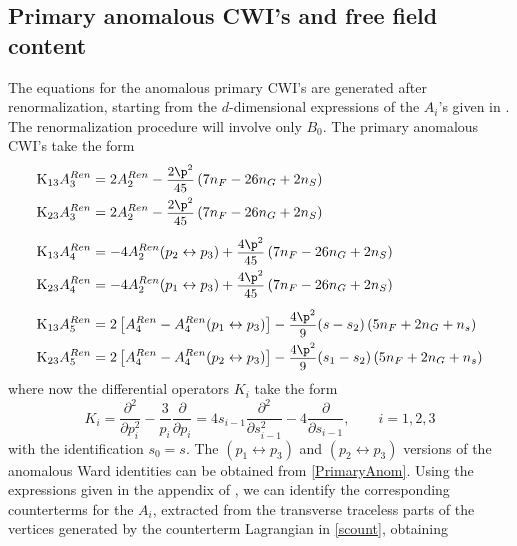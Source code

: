 \documentclass[a4paper,11pt,openright,twoside]{book}
\newcommand{\sdfrac}[2]{\mbox{\small$\displaystyle\frac{#1}{#2}$}}
\numberwithin{equation}{section}
\begin{document}
{{\subsection{Primary anomalous CWI's and free field content}
The equations for the anomalous primary CWI's are generated after renormalization, starting from the $d$-dimensional expressions of the $A_i$'s  given in \cite{Coriano:2018bsy}. The renormalization procedure will involve only $B_0$.
The primary anomalous CWI's take the form
\begin{equation}
	\begin{split}
		& \textup{K}_{13}A^{Ren}_3=2A^{Ren}_2-\sdfrac{2\p^2}{45}\left(7n_F-26n_G+2n_S\right) \\
		&\textup{K}_{23}A^{Ren}_3=2A^{Ren}_2-\sdfrac{2\p^2}{45}\left(7n_F-26n_G+2n_S\right) \\[1.1ex]
		& \textup{K}_{13}A^{Ren}_4=-4A^{Ren}_2(p_2\leftrightarrow p_3)+\sdfrac{4\p^2}{45}\left(7n_F-26n_G+2n_S\right) \\
		&\textup{K}_{23}A^{Ren}_4=-4A^{Ren}_2(p_1\leftrightarrow p_3)+\sdfrac{4\p^2}{45}\left(7n_F-26n_G+2n_S\right) \\[1.1ex]
		& \textup{K}_{13}A^{Ren}_5=2\left[A^{Ren}_4-A^{Ren}_4(p_1\leftrightarrow p_3) \right]-\sdfrac{4\p^2}{9}(s-s_2)\left(5n_F+2n_G+n_s\right)\\
		&\textup{K}_{23}A^{Ren}_5=2\left[A^{Ren}_4-A^{Ren}_4(p_2\leftrightarrow p_3)\right] -\sdfrac{4\p^2}{9}(s_1-s_2)\left(5n_F+2n_G+n_s\right)
	\end{split}\label{PrimaryAnom}
\end{equation}
where now the differential operators $K_i$ take the form
\begin{equation}
	K_i=\frac{\partial^2}{\partial p_i^2}-\frac{3}{p_i}\frac{\partial}{\partial p_i}=4s_{i-1}\frac{\partial^2}{\partial s_{i-1}^2}-4\frac{\partial}{\partial s_{i-1}},\qquad i=1,2,3
\end{equation}
with the identification $s_0=s$. The $(p_1\leftrightarrow p_3)$ and $(p_2\leftrightarrow p_3)$ versions of the anomalous Ward identities can be obtained from \eqref{PrimaryAnom}. 
Using the expressions given in the appendix of \cite{Coriano:2018bsy}, we can identify the corresponding counterterms for the $A_i$, extracted from the 
transverse traceless parts of the vertices generated by the counterterm Lagrangian in \eqref{scount}, obtaining
\begin{align}

\end{align}}}
\end{document}
